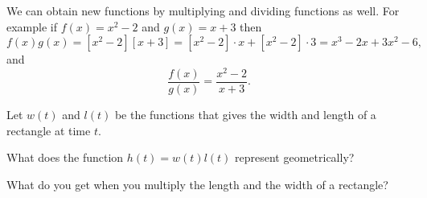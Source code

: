 \documentclass{ximera}
\begin{document}
We can obtain new functions by multiplying and dividing functions as well. 
For example if $f(x)=x^2-2$ and $g(x)=x+3$ then 
\[
f(x)g(x)=[x^2-2][x+3]=[x^2-2]\cdot x+[x^2-2]\cdot 3=x^3-2x+3x^2-6,
\]
and
\[
\frac{f(x)}{g(x)}=\frac{x^2-2}{x+3}.
\]


\begin{question}
Let $w(t)$ and $l(t)$ be the functions that gives the width and length of a rectangle at time $t$.

What does the function $h(t)=w(t)l(t)$ represent geometrically?

\begin{solution}
\begin{multiple-choice}
\end{multiple-choice}
\begin{hint}
What do you get when you multiply the length and the width of a rectangle? 
\end{hint}

\end{solution}
\end{question}
\end{document}
